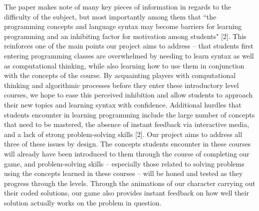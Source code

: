 The paper makes note of many key pieces of information in regards to the difficulty of 
the subject, but most importantly among them that ``the programming concepts and 
language syntax may become barriers for learning programming and an inhibiting factor 
for motivation among students" [2]. This reinforces one of the main points our project 
aims to address -- that students first entering programming classes are overwhelmed by 
needing to learn syntax as well as computational thinking, while also learning how to use them in 
conjunction with the concepts of the course. By acquainting players with computational 
thinking and algorithmic processes before they enter these introductory level courses, 
we hope to ease this perceived inhibition and allow students to approach their new 
topics and learning syntax with confidence. Additional hurdles that students encounter 
in learning programming include the large number of concepts that need to be mastered, 
the absence of instant feedback via interactive media, and a lack of strong problem-solving 
skills [2]. Our project aims to address all three of these issues by design. The concepts 
students encounter in these courses will already have been introduced to them through 
the course of completing our game, and problem-solving skills -- especially those related 
to solving problems using the concepts learned in these courses -- will be honed and 
tested as they progress through the levels. Through the animations of our character 
carrying out their coded solutions, our game also provides instant feedback on how 
well their solution actually works on the problem in question.\\

